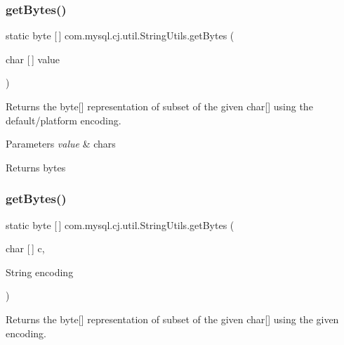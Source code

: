 \subsubsection{\texorpdfstring{get\+Bytes()}{getBytes()}\hspace{0.1cm}{\footnotesize\ttfamily [2/8]}}
{\footnotesize\ttfamily static byte \mbox{[}$\,$\mbox{]} com.\+mysql.\+cj.\+util.\+String\+Utils.\+get\+Bytes (\begin{DoxyParamCaption}\item[{char \mbox{[}$\,$\mbox{]}}]{value }\end{DoxyParamCaption})\hspace{0.3cm}{\ttfamily [static]}}

Returns the byte\mbox{[}\mbox{]} representation of subset of the given char\mbox{[}\mbox{]} using the default/platform encoding.


\begin{DoxyParams}{Parameters}
{\em value} & chars \\
\hline
\end{DoxyParams}
\begin{DoxyReturn}{Returns}
bytes 
\end{DoxyReturn}
\mbox{\label{classcom_1_1mysql_1_1cj_1_1util_1_1_string_utils_a8967b073f47b3abc09e87db0874b5be9}} 
\subsubsection{\texorpdfstring{get\+Bytes()}{getBytes()}\hspace{0.1cm}{\footnotesize\ttfamily [3/8]}}
{\footnotesize\ttfamily static byte \mbox{[}$\,$\mbox{]} com.\+mysql.\+cj.\+util.\+String\+Utils.\+get\+Bytes (\begin{DoxyParamCaption}\item[{char \mbox{[}$\,$\mbox{]}}]{c,  }\item[{String}]{encoding }\end{DoxyParamCaption})\hspace{0.3cm}{\ttfamily [static]}}

Returns the byte\mbox{[}\mbox{]} representation of subset of the given char\mbox{[}\mbox{]} using the given encoding.


